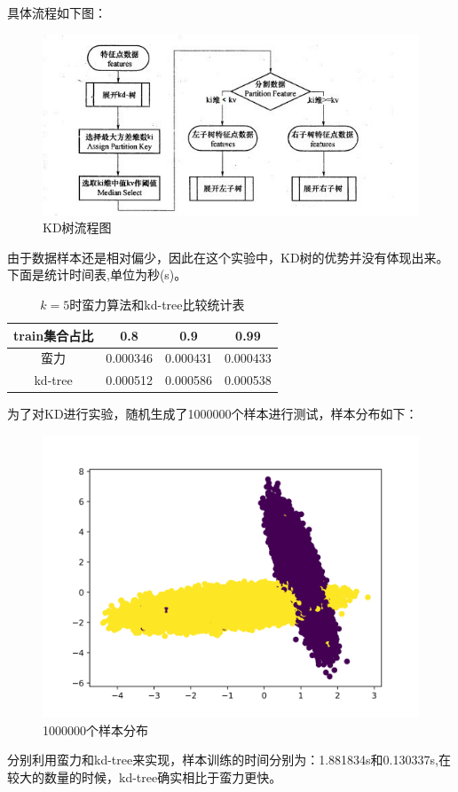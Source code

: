 \documentclass{article}
\newcommand{\hs}{\hspace{2em}}
\begin{document}
\hs 具体流程如下图：

\begin{figure}[htbp]
	\centering
	\includegraphics[width=0.6\linewidth]{img//fig9}
	\caption{KD树流程图}
\end{figure}

由于数据样本还是相对偏少，因此在这个实验中，KD树的优势并没有体现出来。下面是统计时间表,单位为秒(s)。

\begin{table}[htbp]
	\caption{$k=5$时蛮力算法和kd-tree比较统计表}
	\centering
	\begin{tabular}{c|ccc}	
	train集合占比	& 0.8 & 0.9 & 0.99 \\
		\hline
	蛮力    &   0.000346  &    0.000431  &  0.000433 \\
	kd-tree    &   0.000512    &  0.000586  & 0.000538 \\
	\end{tabular}	
\end{table}

为了对KD进行实验，随机生成了1000000个样本进行测试，样本分布如下：

\begin{figure}[htbp]
	\centering
	\includegraphics[width=0.6\linewidth]{img//fig8}
	\caption{1000000个样本分布}
\end{figure}

\hs 分别利用蛮力和kd-tree来实现，样本训练的时间分别为：1.881834s和0.130337s,在较大的数量的时候，kd-tree确实相比于蛮力更快。

\newpage
\end{document}
